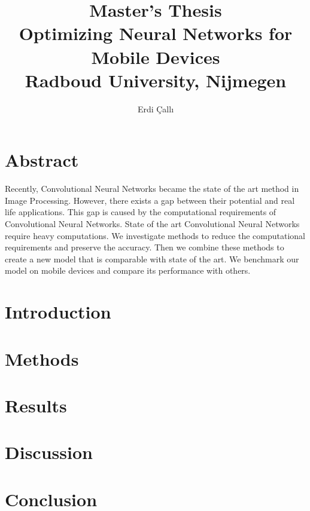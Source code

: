 \documentclass[12pt]{report}
\title{
{\textbf{Master's Thesis}\\Optimizing Neural Networks for Mobile Devices}\\
{\large Radboud University, Nijmegen}
}
\author{Erdi \c{C}all{\i}}
\begin{document}
\maketitle
\chapter*{Abstract}
Recently, Convolutional Neural Networks became the state of the art method in Image Processing. However, there exists a gap between their potential and real life applications. This gap is caused by the computational requirements of Convolutional Neural Networks. State of the art Convolutional Neural Networks require heavy computations. We investigate methods to reduce the computational requirements and preserve the accuracy. Then we combine these methods to create a new model that is comparable with state of the art. We benchmark our model on mobile devices and compare its performance with others.



\tableofcontents

\chapter{Introduction}


\chapter{Methods}




\chapter{Results}


\chapter{Discussion}


\chapter{Conclusion}




\end{document}
